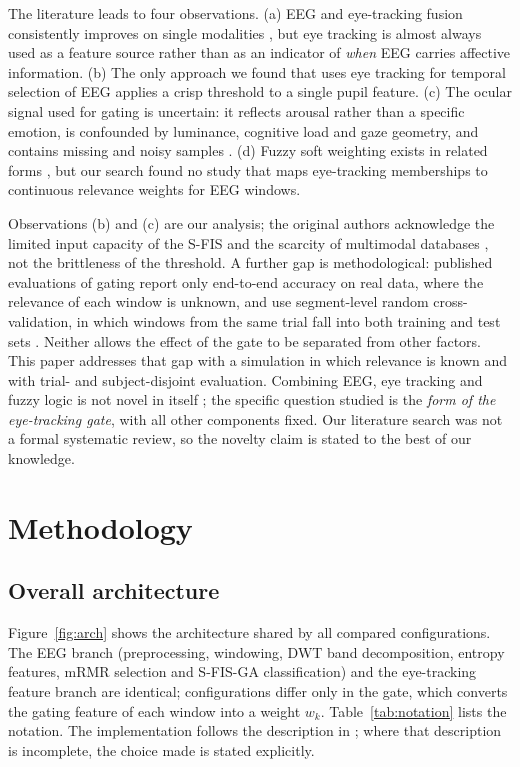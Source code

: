 \documentclass[11pt,a4paper]{article}
\begin{document}
The literature leads to four observations. (a) EEG and eye-tracking fusion consistently improves on single modalities \cite{Lu2015,Zheng2019,Liu2022}, but eye tracking is almost always used as a feature source rather than as an indicator of \emph{when} EEG carries affective information. (b) The only approach we found that uses eye tracking for temporal selection of EEG \cite{FarhadiSedehi2024a,FarhadiSedehi2024b} applies a crisp threshold to a single pupil feature. (c) The ocular signal used for gating is uncertain: it reflects arousal rather than a specific emotion, is confounded by luminance, cognitive load and gaze geometry, and contains missing and noisy samples \cite{Bradley2008,Mathot2018,Raiturkar2016,Holmqvist2012}. (d) Fuzzy soft weighting exists in related forms \cite{LinWang2002,Jacobs1991,Lu2015}, but our search found no study that maps eye-tracking memberships to continuous relevance weights for EEG windows.

Observations (b) and (c) are our analysis; the original authors acknowledge the limited input capacity of the S-FIS and the scarcity of multimodal databases \cite{FarhadiSedehi2024a}, not the brittleness of the threshold. A further gap is methodological: published evaluations of gating report only end-to-end accuracy on real data, where the relevance of each window is unknown, and use segment-level random cross-validation, in which windows from the same trial fall into both training and test sets \cite{FarhadiSedehi2024a,Li2021,Khan2025}. Neither allows the effect of the gate to be separated from other factors. This paper addresses that gap with a simulation in which relevance is known and with trial- and subject-disjoint evaluation. Combining EEG, eye tracking and fuzzy logic is not novel in itself \cite{Lu2015,FarhadiSedehi2024a}; the specific question studied is the \emph{form of the eye-tracking gate}, with all other components fixed. Our literature search was not a formal systematic review, so the novelty claim is stated to the best of our knowledge.

\section{Methodology}
\label{sec:method}

\subsection{Overall architecture}
Figure~\ref{fig:arch} shows the architecture shared by all compared configurations. The EEG branch (preprocessing, windowing, DWT band decomposition, entropy features, mRMR selection and S-FIS-GA classification) and the eye-tracking feature branch are identical; configurations differ only in the gate, which converts the gating feature of each window into a weight $w_k$. Table~\ref{tab:notation} lists the notation. The implementation follows the description in \cite{FarhadiSedehi2024a}; where that description is incomplete, the choice made is stated explicitly.
\end{document}
